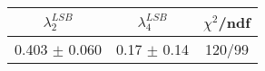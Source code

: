 \begin{tabular}{c|c||c}
$\lambda_{2}^{LSB}$ & $\lambda_4^{LSB}$ & $\chi^{2}$/ndf \\
\hline
0.403 $\pm$ 0.060 & 0.17 $\pm$ 0.14 & 120/99\\
\end{tabular}
